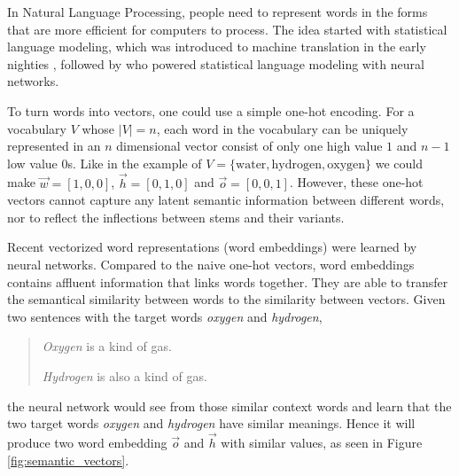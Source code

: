 \documentclass[thesis,fonts=libertine]{cluu}
\begin{document}
In Natural Language Processing, people need to represent words in the forms that are more efficient for computers to process. The idea started with statistical language modeling, which was introduced to machine translation in the early nighties \parencite{brown-etal-1990-statistical}, followed by \textcite{bengio2003neural} who powered statistical language modeling with neural networks.

To turn words into vectors, one could use a simple one-hot encoding. For a vocabulary $V$ whose $|V|=n$, each word in the vocabulary can be uniquely represented in an $n$ dimensional vector consist of only one high value $1$ and $n-1$ low value $0$s. Like in the example of $V=\{\text{water}, \text{hydrogen},  \text{oxygen}\}$ we could make $\vec{w}=[1, 0, 0]$, $\vec{h}=[0, 1, 0]$ and $\vec{o}=[0, 0, 1]$. However, these one-hot vectors cannot capture any latent semantic information between different words, nor to reflect the inflections between stems and their variants.

Recent vectorized word representations (word embeddings) were learned by neural networks. Compared to the naive one-hot vectors, word embeddings contains affluent information that links words together. They are able to transfer the semantical similarity between words to the similarity between vectors. Given two sentences with the target words \textit{oxygen} and \textit{hydrogen},

\begin{quotation}
  \textit{Oxygen} is a kind of gas.
  
  \textit{Hydrogen} is also a kind of gas.
\end{quotation}

\noindent the neural network would see from those similar context words and learn that the two target words \textit{oxygen} and \textit{hydrogen} have similar meanings. Hence it will produce two word embedding $\vec{o}$ and $\vec{h}$ with similar values, as seen in Figure \ref{fig:semantic_vectors}.
\end{document}
